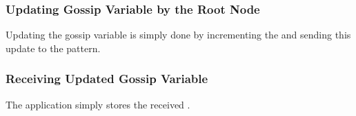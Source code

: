 

\subsubsection{Updating Gossip Variable by the Root Node}

Updating the gossip variable is simply done by incrementing the  and sending this update to the pattern. 



\subsubsection{Receiving Updated Gossip Variable}

The application simply stores the received . 



%





